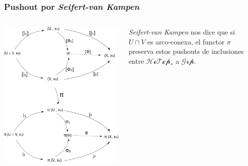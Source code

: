 \documentclass[xetex,mathserif,serif]{beamer}
\newcommand{\vank}{\emph{Seifert-van Kampen} }
\begin{document}
  \begin{frame}
    \frametitle{Pushout por \vank}
    \begin{columns}
      \begin{column}{0.6\textwidth}
        \begin{flushleft}
          \includegraphics[scale=0.33]{../tesis/imagenes/pushoutHotop.png}
        \end{flushleft}
      \end{column}
      \begin{column}{0.4\textwidth}
        \begin{block}{}
          \vank nos dice que si \(U \cap V\) es arco-conexa, el functor
          \(\pi\) preserva estos pushouts de inclusiones entre
          \(\mathscr{HoTop}_*\) a \(\mathscr{Grp}\).
        \end{block}
      \end{column}
    \end{columns}
  \end{frame}
\end{document}
